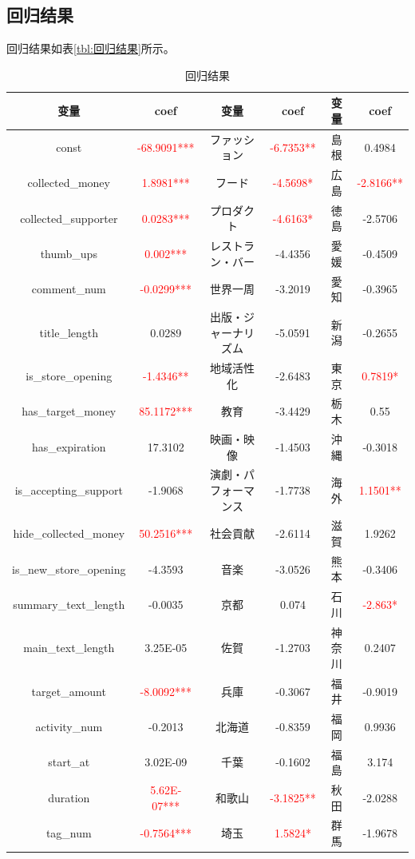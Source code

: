 \documentclass[lang=cn,a4paper]{elegantpaper}
\begin{document}
\subsection{回归结果}
回归结果如表\ref{tbl:回归结果}所示。
\begin{table}[!htbp]
\centering
\caption{回归结果}
  \begin{tabular}{cccccc}
  \toprule
  变量&coef&变量&coef&变量&coef\\
  \midrule
  const&\textcolor{red}{-68.9091***}&ファッション&\textcolor{red}{-6.7353**}&島根&0.4984\\
 collected\_money&\textcolor{red}{1.8981***}&フード&\textcolor{red}{-4.5698*}&広島&\textcolor{red}{-2.8166**}\\
  collected\_supporter&\textcolor{red}{0.0283***}&プロダクト&\textcolor{red}{-4.6163*}&徳島&-2.5706\\
  thumb\_ups&\textcolor{red}{0.002***}&レストラン・バー&-4.4356&愛媛&-0.4509\\
  comment\_num&\textcolor{red}{-0.0299***}&世界一周&-3.2019&愛知&-0.3965\\
  title\_length&0.0289&出版・ジャーナリズム&-5.0591&新潟&-0.2655\\
  is\_store\_opening&\textcolor{red}{-1.4346**}&地域活性化&-2.6483&東京&\textcolor{red}{0.7819*}\\
  has\_target\_money&\textcolor{red}{85.1172***}&教育&-3.4429&栃木&0.55\\
  has\_expiration&17.3102&映画・映像&-1.4503&沖縄&-0.3018\\
  is\_accepting\_support&-1.9068&演劇・パフォーマンス&-1.7738&海外&\textcolor{red}{1.1501**}\\
  hide\_collected\_money&\textcolor{red}{50.2516***}&社会貢献&-2.6114&滋賀&1.9262\\
  is\_new\_store\_opening&-4.3593&音楽&-3.0526&熊本&-0.3406\\
  summary\_text\_length&-0.0035&京都&0.074&石川&\textcolor{red}{-2.863*}\\
  main\_text\_length&3.25E-05&佐賀&-1.2703&神奈川&0.2407\\
  target\_amount&\textcolor{red}{-8.0092***}&兵庫&-0.3067&福井&-0.9019\\
  activity\_num&-0.2013&北海道&-0.8359&福岡&0.9936\\
  start\_at&3.02E-09&千葉&-0.1602&福島&3.174\\
  duration&\textcolor{red}{5.62E-07***}&和歌山&\textcolor{red}{-3.1825**}&秋田&-2.0288\\
  tag\_num&\textcolor{red}{-0.7564***}&埼玉&\textcolor{red}{1.5824*}&群馬&-1.9678\\

\end{tabular}
\end{table}
\end{document}
